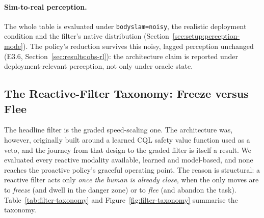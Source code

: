 \documentclass[11pt,a4paper]{report}
\begin{document}
\paragraph{Sim-to-real perception.}
The whole table is evaluated under \texttt{bodyslam=noisy}, the
realistic deployment condition and the filter's native distribution
(Section~\ref{sec:setup:perception-mode}). The policy's reduction
survives this noisy, lagged perception unchanged (E3.6,
Section~\ref{sec:results:obs-rl}): the architecture claim is reported
under deployment-relevant perception, not only under oracle state.

\subsection{The Reactive-Filter Taxonomy: Freeze versus Flee}
\label{sec:results:reactive-taxonomy}

The headline filter is the graded speed-scaling one. The architecture
was, however, originally built around a learned \textsc{CQL} safety
value function used as a veto, and the journey from that design to the
graded filter is itself a result. We evaluated every reactive modality
available, learned and model-based, and none reaches the proactive
policy's graceful operating point. The reason is structural: a reactive
filter acts only \emph{once the human is already close}, when the only
moves are to \emph{freeze} (and dwell in the danger zone) or to
\emph{flee} (and abandon the task). Table~\ref{tab:filter-taxonomy} and
Figure~\ref{fig:filter-taxonomy} summarise the taxonomy.
\end{document}
